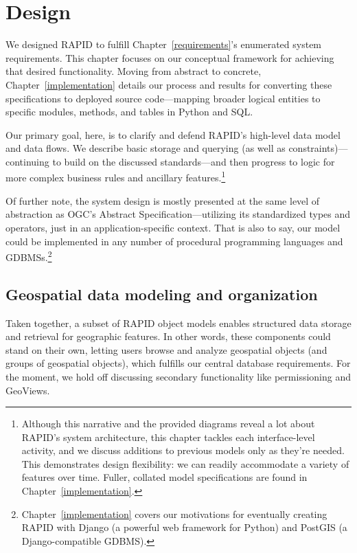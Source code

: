 \chapter{Design}
\label{design}


We designed RAPID to fulfill Chapter~\ref{requirements}'s enumerated system requirements. This chapter focuses on our conceptual framework for achieving that desired functionality. Moving from abstract to concrete, Chapter~\ref{implementation} details our process and results for converting these specifications to deployed source code---mapping broader logical entities to specific modules, methods, and tables in Python and SQL.

Our primary goal, here, is to clarify and defend RAPID's high-level data model and data flows. We describe basic storage and querying (as well as constraints)---continuing to build on the discussed standards---and then progress to logic for more complex business rules and ancillary features.\footnote{Although this narrative and the provided diagrams reveal a lot about RAPID's system architecture, this chapter tackles each interface-level activity, and we discuss additions to previous models only as they're needed. This demonstrates design flexibility: we can readily accommodate a variety of features over time. Fuller, collated model specifications are found in Chapter~\ref{implementation}.}

Of further note, the system design is mostly presented at the same level of abstraction as OGC's Abstract Specification---utilizing its standardized types and operators, just in an application-specific context. That is also to say, our model could be implemented in any number of procedural programming languages and GDBMSs.\footnote{Chapter~\ref{implementation} covers our motivations for eventually creating RAPID with Django (a powerful web framework for Python) and PostGIS (a Django-compatible GDBMS).}

\section{Geospatial data modeling and organization}
Taken together, a subset of RAPID object models enables structured data storage and retrieval for geographic features. In other words, these components could stand on their own, letting users browse and analyze geospatial objects (and groups of geospatial objects), which fulfills our central database requirements. For the moment, we hold off discussing secondary functionality like permissioning and GeoViews.

